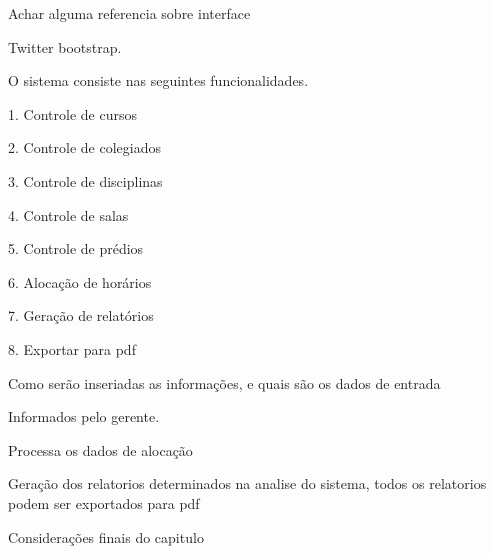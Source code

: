 
	Achar alguma referencia sobre interface
	
	Twitter bootstrap.\par


	O sistema consiste nas seguintes funcionalidades.

	1. Controle de cursos \par
	2. Controle de colegiados\par
	3. Controle de disciplinas\par
	4. Controle de salas\par
	5. Controle de prédios\par
	6. Alocação de horários\par
	7. Geração de relatórios\par
	8. Exportar para pdf\par




	Como serão inseriadas as informações, e quais são os dados de entrada

	Informados pelo gerente.


	Processa os dados de alocação


	Geração dos relatorios determinados na analise do sistema, todos os relatorios podem ser exportados para pdf


Considerações finais do capitulo